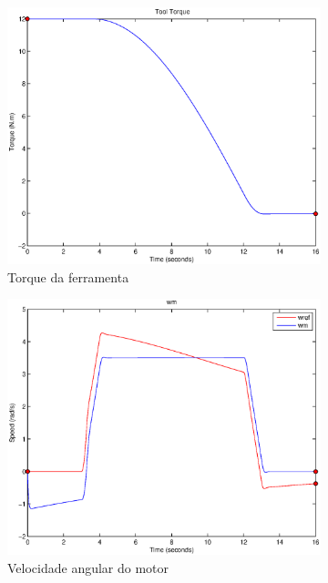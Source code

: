 \documentclass{article}
\begin{document}
\begin{figure}[H]
\begin{subfigure}{0.3\textwidth}
		\includegraphics[width=\linewidth]{matlab/t4}
		\caption{Torque da ferramenta}
	\end{subfigure}
	\begin{subfigure}{0.3\textwidth}
		\includegraphics[width=\linewidth]{matlab/wm4}
		\caption{Velocidade angular do motor}
	\end{subfigure}
	\begin{subfigure}{0.3\textwidth}

\end{subfigure}
\end{figure}
\end{document}
